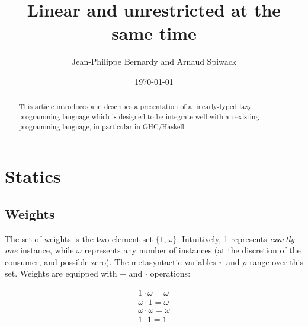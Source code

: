 \documentclass[11pt]{article}
\author{Jean-Philippe Bernardy and Arnaud Spiwack}
\date{\today}
\title{Linear and unrestricted at the same time}
\begin{document}
\maketitle
\begin{abstract}
  \noindent This article introduces and describes a presentation of a
  linearly-typed lazy programming language which is designed to be
  integrate well with an existing programming language, in particular
  in GHC/Haskell.
\end{abstract}

\setcounter{tocdepth}{1}
\tableofcontents


\section{Statics}
\label{sec:orgheadline8}
\subsection{Weights}
\label{sec:orgheadline1}

The set of weights is the two-element set $\{1,ω\}$. Intuitively, 1
represents \emph{exactly one} instance, while $ω$ represents any
number of instances (at the discretion of the consumer, and possible
zero).  The metasyntactic variables \(π\) and \(ρ\) range over this
set. Weights are equipped with + and $·$ operations:


\begin{align*}
1 · ω = ω \\
ω · 1 = ω \\
ω · ω = ω \\
1 · 1 = 1
\end{align*}
\end{document}
